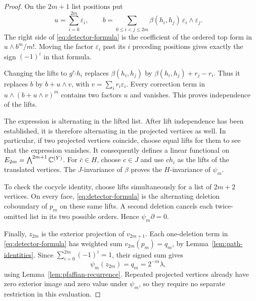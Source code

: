 \begin{proof}
On the $2m+1$ list positions put
\[
 u=\sum_{i=0}^{2m}\varepsilon_i,
 \qquad
 b=\sum_{0\le i<j\le2m}\beta(h_i,h_j)\,
                         \varepsilon_i\wedge\varepsilon_j.
\]
The right side of \eqref{eq:detector-formula} is the coefficient of the
ordered top form in $u\wedge b^m/m!$.  Moving the factor
$\varepsilon_i$ past its $i$ preceding positions gives exactly the sign
$(-1)^i$ in that formula.

Changing the lifts to $g^{r_i}h_i$ replaces $\beta(h_i,h_j)$ by
$\beta(h_i,h_j)+r_j-r_i$.  Thus it replaces $b$ by
$b+u\wedge v$, with $v=\sum_i r_i\varepsilon_i$.  Every correction term
in $u\wedge(b+u\wedge v)^m$ contains two factors $u$ and vanishes.
This proves independence of the lifts.

The expression is alternating in the lifted list.  After lift independence
has been established, it is therefore alternating in the projected
vertices as well.  In particular, if two projected vertices coincide,
choose equal lifts for them to see that the expression vanishes.  It
consequently defines a linear functional on
$E_{2m}=\bigwedge^{2m+1}\mathbb C^{(Y)}$.
For $\bar c\in H$, choose $c\in J$ and use $c h_i$ as the lifts of the
translated vertices.  The $J$-invariance of $\beta$ proves the
$H$-invariance of $\psi_m$.

To check the cocycle identity, choose lifts simultaneously for a list of
$2m+2$ vertices.  On every face, \eqref{eq:detector-formula} is the
alternating deletion coboundary of $p_m$ on these same lifts.  A second
deletion cancels each twice-omitted list in its two possible orders.
Hence $\psi_m\partial=0$.

Finally, $z_{2m}$ is the exterior projection of $v_{2m+1}$.
Each one-deletion term in \eqref{eq:detector-formula} has weighted sum
$v_{2m}(p_m)=q_m$, by Lemma~\ref{lem:path-identities}.  Since
$\sum_{i=0}^{2m}(-1)^i=1$, their signed sum gives
\[
 \psi_m(z_{2m})=q_m=2^{-m}\lambda,
\]
using Lemma~\ref{lem:pfaffian-recurrence}.  Repeated projected vertices
already have zero exterior image and zero value under $\psi_m$, so they
require no separate restriction in this evaluation.
\end{proof}
